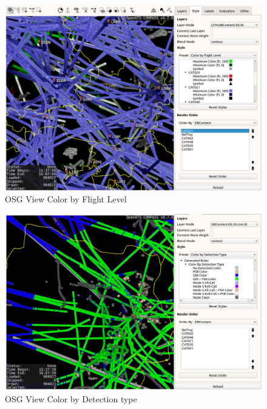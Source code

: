 \begin{figure}[H]
    \hspace*{-2.5cm}
    \includegraphics[width=19cm,frame]{figures/osgview_style_flight_level.png}
  \caption{OSG View Color by Flight Level}
\end{figure}

\begin{figure}[H]
    \hspace*{-2.5cm}
    \includegraphics[width=19cm,frame]{figures/osgview_style_detection_type.png}
  \caption{OSG View Color by Detection type}
\end{figure}

